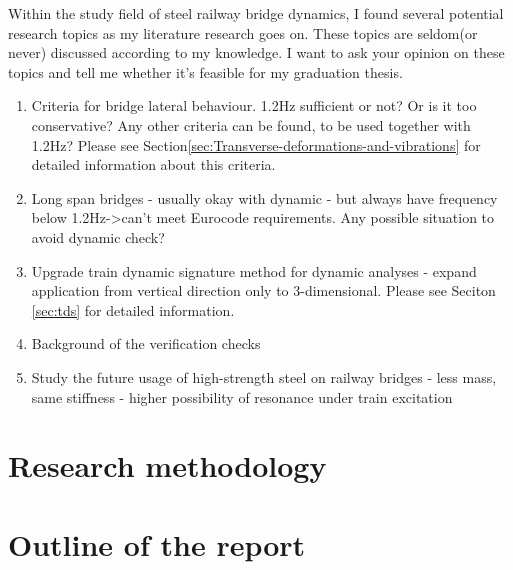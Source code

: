 





Within the study field of steel railway bridge dynamics, I found several potential research topics as my literature research goes on. These topics are seldom(or never) discussed according to my knowledge. I want to ask your opinion on these topics and tell me whether it's feasible for my graduation thesis. 

\begin{enumerate}
	\item Criteria for bridge lateral behaviour. 1.2Hz sufficient or not? Or is it too conservative? Any other criteria can be found, to be used together with 1.2Hz? Please see Section\ref{sec:Transverse-deformations-and-vibrations} for detailed information about this criteria.
	\item Long span bridges - usually okay with dynamic - but always have frequency below 1.2Hz->can't meet Eurocode requirements. Any possible situation to avoid dynamic check?
	\item Upgrade train dynamic signature method for dynamic analyses - expand application from vertical direction only to 3-dimensional. Please see Seciton \ref{sec:tds} for detailed information.
	\item Background of the verification checks
	\item Study the future usage of high-strength steel on railway bridges - less mass, same stiffness - higher possibility of resonance under train excitation
\end{enumerate}


\section{Research methodology}
\section{Outline of the report}

